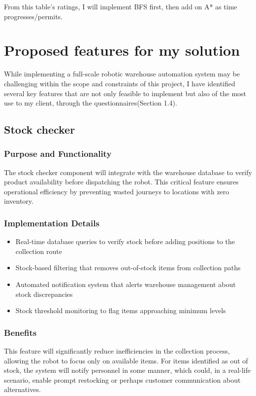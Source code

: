 From this table's ratings, I will implement BFS first, then add on A* as time progresses/permits.

\newpage

\section{Proposed features for my solution}

While implementing a full-scale robotic warehouse automation system may be challenging within the scope and constraints of this project, I have identified several key features that are not only feasible to implement but also of the most use to my client, through the questionnaires(Section 1.4).

\subsection{Stock checker}

\subsubsection{Purpose and Functionality}
The stock checker component will integrate with the warehouse database to verify product availability before dispatching the robot. This critical feature ensures operational efficiency by preventing wasted journeys to locations with zero inventory.

\subsubsection{Implementation Details}
\begin{itemize}
    \item Real-time database queries to verify stock before adding positions to the collection route
    \item Stock-based filtering that removes out-of-stock items from collection paths
    \item Automated notification system that alerts warehouse management about stock discrepancies
    \item Stock threshold monitoring to flag items approaching minimum levels
\end{itemize}

\subsubsection{Benefits}
This feature will significantly reduce inefficiencies in the collection process, allowing the robot to focus only on available items. For items identified as out of stock, the system will notify personnel in some manner, which could, in a real-life scenario, enable prompt restocking or perhaps customer communication about alternatives.

